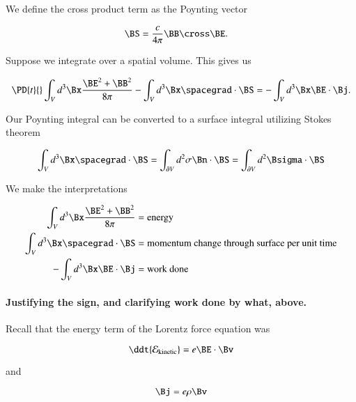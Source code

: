 We define the cross product term as the Poynting vector

\begin{align}\label{eqn:relativisticElectrodynamicsL16:650}
\BS &= \frac{c}{4 \pi} \BB \cross \BE.
\end{align}

Suppose we integrate over a spatial volume.  This gives us

\begin{equation}\label{eqn:relativisticElectrodynamicsL16:670b}
\PD{t}{}\int_V d^3 \Bx \frac{ \BE^2 + \BB^2 }{8 \pi} - \int_V d^3 \Bx \spacegrad \cdot \BS = - \int_V d^3 \Bx \BE \cdot \Bj.
\end{equation}

Our Poynting integral can be converted to a surface integral utilizing Stokes theorem

\begin{equation}\label{eqn:relativisticElectrodynamicsL16:800}
\int_V d^3 \Bx \spacegrad \cdot \BS = \int_{\partial V} d^2 \sigma \Bn \cdot \BS =
\int_{\partial V} d^2 \Bsigma \cdot \BS
\end{equation}

We make the interpretations

\begin{align*}
\int_V d^3 \Bx \frac{ \BE^2 + \BB^2 }{8 \pi} &= \mbox{energy} \\
\int_V d^3 \Bx \spacegrad \cdot \BS &= \mbox{momentum change through surface per unit time} \\
- \int_V d^3 \Bx \BE \cdot \Bj &= \mbox{work done}
\end{align*}

\paragraph{Justifying the sign, and clarifying work done by what, above.}

Recall that the energy term of the Lorentz force equation was

\begin{equation}\label{eqn:relativisticElectrodynamicsL16:820}
\ddt{\mathcal{E}_{\text{kinetic}}} = e \BE \cdot \Bv
\end{equation}

and

\begin{equation}\label{eqn:relativisticElectrodynamicsL16:840}
\Bj = e \rho \Bv
\end{equation}

